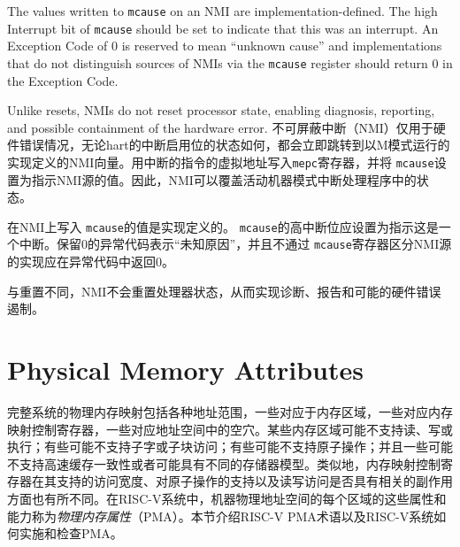 {The values written to {\tt mcause} on an NMI are
implementation-defined.  The high Interrupt bit of {\tt mcause} should
be set to indicate that this was an interrupt.  An Exception Code of 0
is reserved to mean ``unknown cause'' and implementations that do not
distinguish sources of NMIs via the {\tt mcause} register should
return 0 in the Exception Code.

Unlike resets, NMIs do not reset processor state, enabling diagnosis,
reporting, and possible containment of the hardware error.
\fi
不可屏蔽中断（NMI）仅用于硬件错误情况，无论hart的中断启用位的状态如何，都会立即跳转到以M模式运行的实现定义的NMI向量。用中断的指令的虚拟地址写入{\tt mepc}寄存器，并将 {\tt mcause}设置为指示NMI源的值。因此，NMI可以覆盖活动机器模式中断处理程序中的状态。

在NMI上写入 {\tt mcause}的值是实现定义的。 {\tt mcause}的高中断位应设置为指示这是一个中断。保留0的异常代码表示“未知原因”，并且不通过 {\tt mcause}寄存器区分NMI源的实现应在异常代码中返回0。

与重置不同，NMI不会重置处理器状态，从而实现诊断、报告和可能的硬件错误遏制。

\section{Physical Memory Attributes}
\label{sec:pma}

\iffalse
The physical memory map for a complete system includes various address
ranges, some corresponding to memory regions, some to memory-mapped
control registers, and some to vacant holes in the address space.  Some
memory regions might not support reads, writes, or execution; some
might not support subword or subblock accesses; some might not support
atomic operations; and some might not support cache coherence or might
have different memory models.  Similarly, memory-mapped control
registers vary in their supported access widths, support for atomic
operations, and whether read and write accesses have associated side
effects.  In RISC-V systems, these properties and capabilities of each
region of the machine's physical address space are termed {\em
  physical memory attributes} (PMAs).  This section describes RISC-V
PMA terminology and how RISC-V systems implement and check PMAs.
\fi
完整系统的物理内存映射包括各种地址范围，一些对应于内存区域，一些对应内存映射控制寄存器，一些对应地址空间中的空穴。某些内存区域可能不支持读、写或执行；有些可能不支持子字或子块访问；有些可能不支持原子操作；并且一些可能不支持高速缓存一致性或者可能具有不同的存储器模型。类似地，内存映射控制寄存器在其支持的访问宽度、对原子操作的支持以及读写访问是否具有相关的副作用方面也有所不同。在RISC-V系统中，机器物理地址空间的每个区域的这些属性和能力称为{\em 物理内存属性}（PMA）。本节介绍RISC-V PMA术语以及RISC-V系统如何实施和检查PMA。

}

